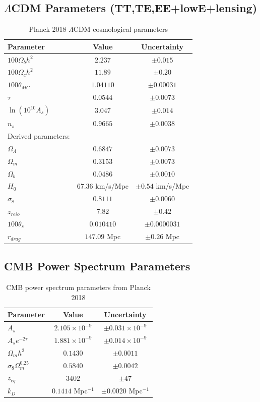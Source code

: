 \subsection{$\Lambda$CDM Parameters (TT,TE,EE+lowE+lensing)}

\begin{table}[h]
\centering
\begin{tabular}{lcc}
\hline
Parameter & Value & Uncertainty \\
\hline
$100\Omega_b h^2$ & $2.237$ & $\pm0.015$ \\
$100\Omega_c h^2$ & $11.89$ & $\pm0.20$ \\
$100\theta_{MC}$ & $1.04110$ & $\pm0.00031$ \\
$\tau$ & $0.0544$ & $\pm0.0073$ \\
$\ln(10^{10}A_s)$ & $3.047$ & $\pm0.014$ \\
$n_s$ & $0.9665$ & $\pm0.0038$ \\
\hline
Derived parameters: \\
$\Omega_\Lambda$ & $0.6847$ & $\pm0.0073$ \\
$\Omega_m$ & $0.3153$ & $\pm0.0073$ \\
$\Omega_b$ & $0.0486$ & $\pm0.0010$ \\
$H_0$ & $67.36$ km/s/Mpc & $\pm0.54$ km/s/Mpc \\
$\sigma_8$ & $0.8111$ & $\pm0.0060$ \\
$z_{reio}$ & $7.82$ & $\pm0.42$ \\
$100\theta_s$ & $0.010410$ & $\pm0.0000031$ \\
$r_{drag}$ & $147.09$ Mpc & $\pm0.26$ Mpc \\
\hline
\end{tabular}
\caption{Planck 2018 $\Lambda$CDM cosmological parameters}
\end{table}

\subsection{CMB Power Spectrum Parameters}

\begin{table}[h]
\centering
\begin{tabular}{lcc}
\hline
Parameter & Value & Uncertainty \\
\hline
$A_s$ & $2.105\times10^{-9}$ & $\pm0.031\times10^{-9}$ \\
$A_{s}e^{-2\tau}$ & $1.881\times10^{-9}$ & $\pm0.014\times10^{-9}$ \\
$\Omega_m h^2$ & $0.1430$ & $\pm0.0011$ \\
$\sigma_8 \Omega_m^{0.25}$ & $0.5840$ & $\pm0.0042$ \\
$z_{eq}$ & $3402$ & $\pm47$ \\
$k_{D}$ & $0.1414$ Mpc$^{-1}$ & $\pm0.0020$ Mpc$^{-1}$ \\
\hline
\end{tabular}
\caption{CMB power spectrum parameters from Planck 2018}
\end{table}

